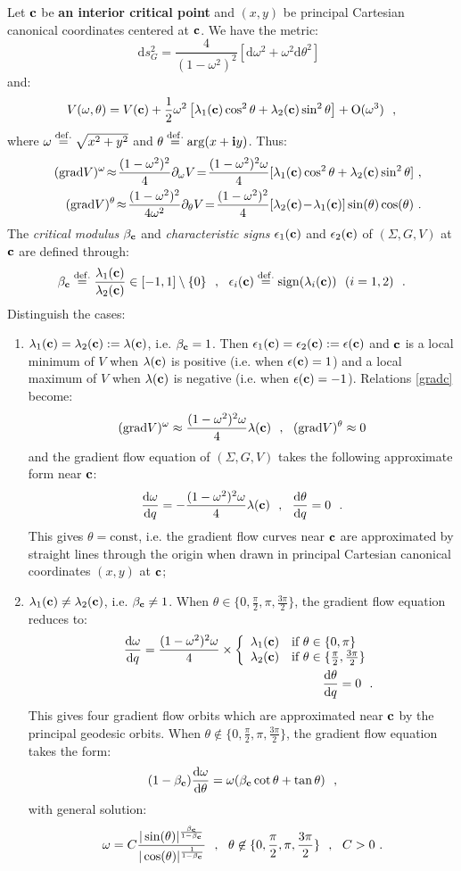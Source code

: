 \documentclass[a4paper,11pt]{article}
\theoremstyle{plain}
\theoremstyle{definition}
\theoremstyle{remark}
\newcommand{\be}{\begin{equation*}}
\newcommand{\ee}{\end{equation*}}
\newcommand{\ben}{\begin{equation}}
\newcommand{\een}{\end{equation}}
\newcommand{\beqa}{\begin{eqnarray*}}
\newcommand{\eeqa}{\end{eqnarray*}}
\newcommand{\beqan}{\begin{eqnarray}}
\newcommand{\eeqan}{\end{eqnarray}}
\newcommand{\nn}{\nonumber}
\def\i{\mathbf{i}}
\def \const{\mathrm{const}}
\def\const{\mathrm{const}}
\newcommand{\pd}{\partial}
\def\dd{\mathrm{d}}
\newcommand{\sign}{\mathrm{sign}}
\def\c{{\bf c}}
\newcommand{\eqdef}{\stackrel{{\rm def.}}{=}}
\def\grad{\mathrm{grad}}
\def\O{\mathrm{O}}
\newcommand{\twopartdef}[4]
{
	\left\{
	\begin{array}{ll}
		#1 & \mbox{if } #2 \\
		#3 & \mbox{if } #4
	\end{array}
	\right.
}
\begin{document}
\noindent Let $\c$ be {\bf an interior critical point} and $(x,y)$ be
principal Cartesian canonical coordinates centered at $\c$. We have the metric:
\be
\dd s^2_G=\frac{4}{(1-\omega^2)^2}[\dd \omega^2+\omega^2\dd \theta^2]~~
\ee
and:
\be
V(\omega,\theta)= V(\c)+\frac{1}{2}\omega^2\left[\lambda_1(\c) \cos^2\theta +\lambda_2(\c) \sin^2\theta\right]+\O(\omega^3)~~,
\ee
where $\omega\eqdef\sqrt{x^2+y^2}$ and $\theta\eqdef \arg(x+\i y)$. Thus:
\beqan
\label{gradc}
&& (\grad V)^\omega\!\approx\!\frac{(1-\omega^2)^2}{4} \pd_\omega V\!=\!\frac{(1-\omega^2)^2\omega}{4}[\lambda_1(\c)\cos^2\theta+\lambda_2(\c)\sin^2\theta]~,\nn\\
&& (\grad V)^\theta\!\approx\!\frac{(1-\omega^2)^2}{4\omega^2} \pd_\theta V\!=\!\frac{(1-\omega^2)^2}{4} [\lambda_2(\c)\!-\!\lambda_1(\c)]\sin(\theta)\cos(\theta)~.
\eeqan
The {\em critical
modulus} $\beta_\c$ and {\em characteristic signs} $\epsilon_1(\c)$
and $\epsilon_2(\c)$ of $(\Sigma,G,V)$ at $\c$ are defined through:
\be
\beta_\c\eqdef\frac{\lambda_1(\c)}{\lambda_2(\c)}\in [-1,1]\setminus \{0\}~~,~~\epsilon_i(\c)\eqdef \sign(\lambda_i(\c))~~(i=1,2)~~.
\ee
Distinguish the cases:
\begin{enumerate}
\item $\lambda_1(\c)=\lambda_2(\c):=\lambda(\c)$,
  i.e. $\beta_\c=1$. Then $\epsilon_1(\c)=\epsilon_2(\c):=\epsilon(\c)$
and $\c$ is a local minimum of $V$ when $\lambda(\c)$ is positive
(i.e. when $\epsilon(\c)=1$) and a local maximum of $V$ when
$\lambda(\c)$ is negative (i.e. when $\epsilon(\c)=-1$). Relations
\eqref{gradc} become:
\be
(\grad V)^\omega\approx \frac{(1-\omega^2)^2\omega}{4}\lambda(\c)~~,~~ (\grad V)^\theta\approx 0
\ee
and the gradient flow equation of $(\Sigma,G,V)$ takes the following approximate form near $\c$:
\be
\frac{\dd \omega}{\dd q}=-\frac{(1-\omega^2)^2\omega}{4}\lambda(\c)~~,~~\frac{\dd \theta}{\dd q}=0~~.
\ee
This gives $\theta=\const$, i.e. the gradient flow curves near $\c$
are approximated by straight lines through the origin when drawn in
principal Cartesian canonical coordinates $(x,y)$ at $\c$; 
\item $\lambda_1(\c)\neq \lambda_2(\c)$, i.e. $\beta_\c\neq 1$.  When
$\theta\in \{0,\frac{\pi}{2}, \pi, \frac{3\pi}{2}\}$, the gradient
flow equation reduces to:
\beqa
&&\frac{\dd \omega}{\dd q}=\frac{(1-\omega^2)^2\omega}{4}\times \twopartdef{\lambda_1(\c)}{\theta\in \{0,\pi\}}{\lambda_2(\c)}{\theta\in \{\frac{\pi}{2},\frac{3\pi}{2}\}}\\
&& \frac{\dd \theta}{\dd q}=0~~.
\eeqa
This gives four gradient flow orbits which are approximated near $\c$
by the principal geodesic orbits. When $\theta\not \in
\{0,\frac{\pi}{2}, \pi, \frac{3\pi}{2}\}$, the gradient flow equation
takes the form:
\ben
\label{gradcn}
(1-\beta_\c)\frac{\dd \omega}{\dd \theta}=\omega (\beta_\c\cot\theta+\tan\theta)~~,
\een
with general solution:
\ben
\label{gradflowc}
\omega=C \frac{|\sin(\theta)|^{\frac{\beta_\c}{1-\beta_\c}}}{|\cos(\theta)|^\frac{1}{1-\beta_\c}}~~, ~~\theta\not \in
\{0,\frac{\pi}{2}, \pi, \frac{3\pi}{2}\}~~,~~C>0~.
\een
\end{enumerate}
\end{document}
